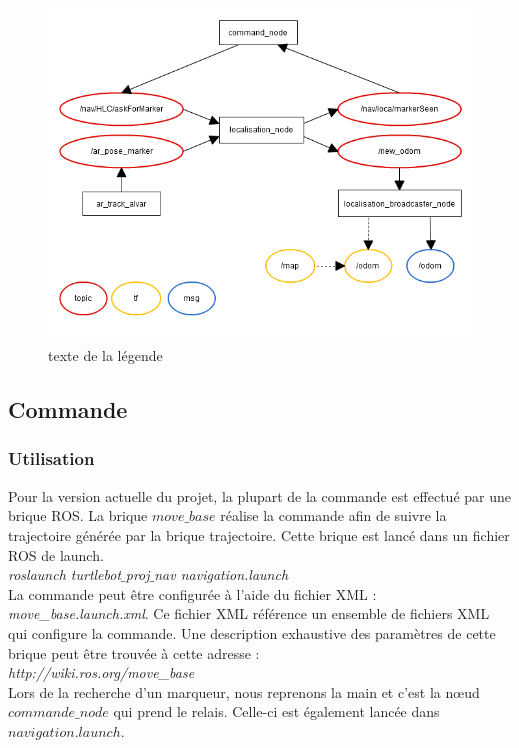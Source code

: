 \documentclass[10pt,a4paper]{article}
\begin{document}
\begin{figure}
\center
\includegraphics[scale=0.6]{figures/rqt_loca.png} 
\caption{texte de la légende}	
\end{figure}




\subsection{Commande}
\label{sec:commande}
\subsubsection{Utilisation}

Pour la version actuelle du projet, la plupart de la commande est effectué par une brique ROS. La brique $move\_base$ réalise la commande afin de suivre la trajectoire générée par la brique trajectoire. Cette brique est lancé dans un fichier ROS de launch.\\
\textit{roslaunch turtlebot$\_$proj$\_$nav navigation.launch}\\
La commande peut être configurée à l'aide du fichier XML : \textit{move\_base.launch.xml}. Ce fichier XML référence un ensemble de fichiers XML qui configure la commande. Une description exhaustive des paramètres de cette brique peut être trouvée à cette adresse :\\
\textit{http://wiki.ros.org/move\_base}\\
Lors de la recherche d'un marqueur, nous reprenons la main et c'est la nœud $commande\_node$ qui prend le relais. Celle-ci est également lancée dans $navigation.launch$.
\end{document}
